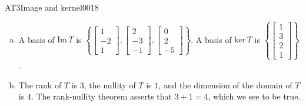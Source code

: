 \begin{exercise}{AT3}{Image and kernel}{0018}
\begin{exerciseAnswer}
\begin{enumerate}[(a)]
 
\item  

 A basis of \(\mathrm{Im}\,T\) is \(\left\{ \left[\begin{array}{c}
1 \\
-2 \\
1
\end{array}\right] , \left[\begin{array}{c}
2 \\
-3 \\
-1
\end{array}\right] , \left[\begin{array}{c}
0 \\
2 \\
-5
\end{array}\right] \right\}\). A basis of \(\mathrm{ker}\,T\) is \(\left\{ \left[\begin{array}{c}
1 \\
3 \\
2 \\
1
\end{array}\right] \right\}\). 

 
\item  

 The rank of \(T\) is \(3\), the nullity of \(T\) is \(1\), and the dimension of the domain of \(T\) is \(4\). The rank-nullity theorem asserts that \(3+1=4\), which we see to be true. 

 
\end{enumerate}

     \end{exerciseAnswer}
 \end{exercise}


\newpage




